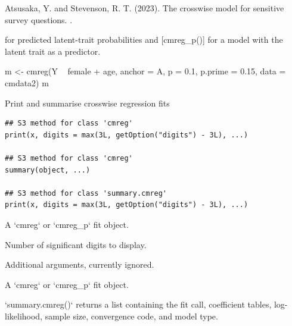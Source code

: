 \documentclass[a4paper]{book}
\begin{document}
%
\begin{References}
Atsusaka, Y. and Stevenson, R. T. (2023). The crosswise model
for sensitive survey questions. .
\end{References}
%
\begin{SeeAlso}
[cmpredict()] for predicted latent-trait probabilities and
[cmreg\_p()] for a model with the latent trait as a predictor.
\end{SeeAlso}
%
\begin{Examples}
\begin{ExampleCode}
m <- cmreg(Y ~ female + age, anchor = A, p = 0.1, p.prime = 0.15,
           data = cmdata2)
m
\end{ExampleCode}
\end{Examples}
%
\begin{Description}
Print and summarise crosswise regression fits
\end{Description}
%
\begin{Usage}
\begin{verbatim}
## S3 method for class 'cmreg'
print(x, digits = max(3L, getOption("digits") - 3L), ...)

## S3 method for class 'cmreg'
summary(object, ...)

## S3 method for class 'summary.cmreg'
print(x, digits = max(3L, getOption("digits") - 3L), ...)
\end{verbatim}
\end{Usage}
%
\begin{Arguments}
\begin{ldescription}
\item[\code{x}] A `cmreg` or `cmreg\_p` fit object.

\item[\code{digits}] Number of significant digits to display.

\item[\code{...}] Additional arguments, currently ignored.

\item[\code{object}] A `cmreg` or `cmreg\_p` fit object.
\end{ldescription}
\end{Arguments}
%
\begin{Value}
`summary.cmreg()` returns a list containing the fit call, coefficient
tables, log-likelihood, sample size, convergence code, and model type.
\end{Value}
\end{document}
